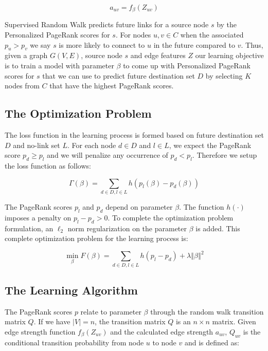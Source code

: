 \documentclass[10pt]{article}
\begin{document}
\begin{multicols}{2}
\begin{displaymath}
a_{uv} = f_{\beta}(Z_{uv})
\end{displaymath}

Supervised Random Walk predicts future links for a source node $s$ by the Personalized PageRank scores for $s$. For nodes $u, v \in C$ when the associated $p_{u} > p_{v}$ we say $s$ is more likely to connect to $u$ in the future compared to $v$. Thus, given a graph $G(V, E)$, source node $s$ and edge features $Z$ our learning objective is to train a model with parameter $\beta$ to come up with Personalized PageRank scores for $s$ that we can use to predict future destination set $D$ by selecting $K$ nodes from $C$ that have the highest PageRank scores.

\subsection{The Optimization Problem}

The loss function in the learning process is formed based on future destination set $D$ and no-link set $L$. For each node $d\in D$ and $l\in L$, we expect the PageRank score $p_{d} \ge p_{l}$ and we will penalize any occurrence of $p_{d} < p_{l}$. Therefore we setup the loss function as follows:

\begin{displaymath}
\Gamma (\beta)  = \sum\limits_{d \in D, l \in L} h(p_{l}(\beta) - p_{d}(\beta))
\end{displaymath}

The PageRank scores $p_{l}$ and $p_{d}$ depend on parameter $\beta$. The function $h(\cdot)$ imposes a penalty on $p_{l} - p_{d} > 0$. To complete the optimization problem formulation, an $\ell_{2}$ norm regularization on the parameter $\beta$ is added. This complete optimization problem for the learning process is:

\begin{equation}
\min_{\beta}F(\beta) = \sum\limits_{d \in D, l \in L} h(p_{l} - p_{d}) + \lambda\left\Vert\beta\right\Vert^2
\end{equation}

\subsection{The Learning Algorithm}

The PageRank scores $p$ relate to parameter $\beta$ through the random walk transition matrix $Q$. If we have $\vert V\vert = n$, the transition matrix $Q$ is an $n\times n$ matrix. Given edge strength function $f_{\beta}(Z_{uv})$ and the calculated edge strength $a_{uv}$, $Q_{uv}$ is the conditional transition probability from node $u$ to node $v$ and is defined as:


\end{multicols}
\end{document}
